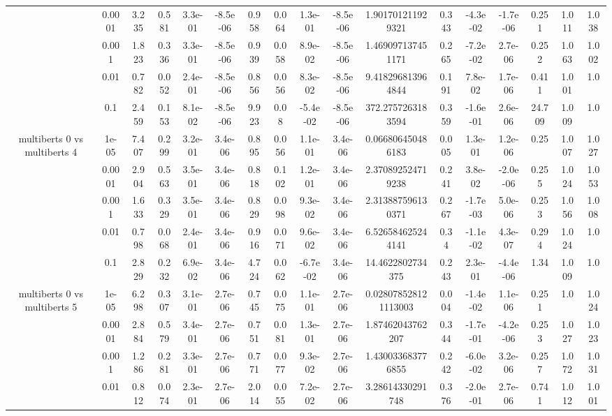 \begin{tabular}{|c|c|c|c|c|c|c|c|c|c|c|c|c|c|c|c|c|}
 & 0.0001 & 3.235 & 0.581 & 3.3e-01 & -8.5e-06 & 0.958 & 0.064 & 1.3e-01 & -8.5e-06 & 1.901701211929321 & 0.343 & -4.3e-02 & -1.7e-06 & 0.251 & 1.011 & 1.038 \\
 & 0.001 & 1.823 & 0.336 & 3.3e-01 & -8.5e-06 & 0.939 & 0.058 & 8.9e-02 & -8.5e-06 & 1.469097137451171 & 0.265 & -7.2e-02 & 2.7e-06 & 0.252 & 1.063 & 1.002 \\
 & 0.01 & 0.782 & 0.052 & 2.4e-01 & -8.5e-06 & 0.856 & 0.056 & 8.3e-02 & -8.5e-06 & 9.418296813964844 & 0.191 & 7.8e-02 & 1.7e-06 & 0.411 & 1.001 & 1.0 \\
 & 0.1 & 2.459 & 0.153 & 8.1e-02 & -8.5e-06 & 9.923 & 0.08 & -5.4e-02 & -8.5e-06 & 372.2757263183594 & 0.359 & -1.6e-01 & 2.6e-06 & 24.709 & 1.009 & 1.0 \\
\hline
\multirow{5}{*}{multiberts 0 vs multiberts 4} & 1e-05 & 7.407 & 0.299 & 3.2e-01 & 3.4e-06 & 0.895 & 0.056 & 1.1e-01 & 3.4e-06 & 0.066806450486183 & 0.005 & 1.3e-01 & 1.2e-06 & 0.25 & 1.007 & 1.027 \\
 & 0.0001 & 2.904 & 0.563 & 3.5e-01 & 3.4e-06 & 0.818 & 0.102 & 1.2e-01 & 3.4e-06 & 2.370892524719238 & 0.241 & 3.8e-02 & -2.0e-06 & 0.255 & 1.024 & 1.053 \\
 & 0.001 & 1.633 & 0.329 & 3.5e-01 & 3.4e-06 & 0.829 & 0.098 & 9.3e-02 & 3.4e-06 & 2.313887596130371 & 0.267 & -1.7e-03 & 5.0e-06 & 0.253 & 1.056 & 1.008 \\
 & 0.01 & 0.798 & 0.068 & 2.4e-01 & 3.4e-06 & 0.916 & 0.071 & 9.6e-02 & 3.4e-06 & 6.526584625244141 & 0.34 & -1.1e-02 & 4.3e-07 & 0.294 & 1.024 & 1.0 \\
 & 0.1 & 2.829 & 0.232 & 6.9e-02 & 3.4e-06 & 4.724 & 0.062 & -6.7e-02 & 3.4e-06 & 14.4622802734375 & 0.243 & 2.3e-01 & -4.4e-06 & 1.34 & 1.009 & 1.0 \\
\hline
\multirow{5}{*}{multiberts 0 vs multiberts 5} & 1e-05 & 6.298 & 0.307 & 3.1e-01 & 2.7e-06 & 0.745 & 0.075 & 1.1e-01 & 2.7e-06 & 0.028078528121113003 & 0.004 & -1.4e-02 & 1.1e-06 & 0.251 & 1.0 & 1.024 \\
 & 0.0001 & 2.884 & 0.579 & 3.4e-01 & 2.7e-06 & 0.751 & 0.081 & 1.3e-01 & 2.7e-06 & 1.87462043762207 & 0.344 & -1.7e-01 & -4.2e-06 & 0.253 & 1.027 & 1.023 \\
 & 0.001 & 1.286 & 0.281 & 3.3e-01 & 2.7e-06 & 0.771 & 0.077 & 9.3e-02 & 2.7e-06 & 1.430033683776855 & 0.242 & -6.0e-02 & 3.2e-06 & 0.257 & 1.072 & 1.031 \\
 & 0.01 & 0.812 & 0.074 & 2.3e-01 & 2.7e-06 & 2.014 & 0.055 & 7.2e-02 & 2.7e-06 & 3.28614330291748 & 0.376 & -2.0e-01 & 2.7e-06 & 0.741 & 1.012 & 1.001 \\

\end{tabular}
